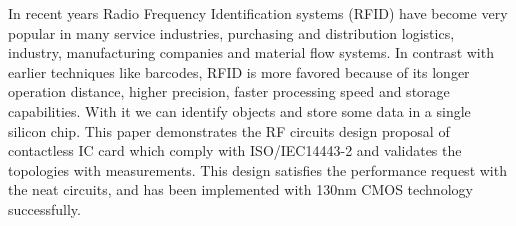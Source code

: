 In recent years Radio Frequency Identification systems (RFID) \cite{rfid_handbook} have become very popular in many service industries, purchasing and distribution logistics, industry, manufacturing companies and material flow systems. In contrast with earlier techniques like barcodes, RFID is more favored because of its longer operation distance, higher precision, faster processing speed and storage capabilities. With it we can identify objects and store some data in a single silicon chip. This paper demonstrates the RF circuits design proposal of contactless IC card which comply with ISO/IEC14443-2 \cite{nfc_spec} and validates the topologies with measurements. This design satisfies the performance request with the neat circuits, and has been implemented with 130nm CMOS technology successfully.